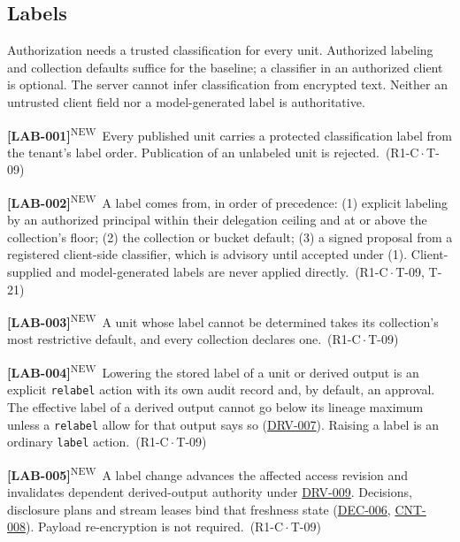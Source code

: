 \documentclass[11pt,a4paper]{article}
\newcommand{\code}[1]{{\small\nolinkurl{#1}}}
\newcommand{\rr}[1]{\hyperlink{req:#1}{#1}}
\newcommand{\reqtag}[2]{{\footnotesize\color{accent}(#1\,$\cdot$\,#2)}}
\newcommand{\reqn}[4]{\par\noindent\hypertarget{req:#1}{\textbf{[#1]}}\textsuperscript{\color{accent}\tiny NEW}\ #4\ \reqtag{#2}{#3}\par}
\begin{document}
\subsection{Labels}\label{sec:labels}
Authorization needs a trusted classification for every unit. Authorized labeling and collection defaults suffice for the baseline; a classifier in an authorized client is optional. The server cannot infer classification from encrypted text. Neither an untrusted client field nor a model-generated label is authoritative.
\reqn{LAB-001}{R1-C}{T-09}{Every published unit carries a protected classification label from the tenant's label order. Publication of an unlabeled unit is rejected.}
\reqn{LAB-002}{R1-C}{T-09, T-21}{A label comes from, in order of precedence: (1) explicit labeling by an authorized principal within their delegation ceiling and at or above the collection's floor; (2) the collection or bucket default; (3) a signed proposal from a registered client-side classifier, which is advisory until accepted under (1). Client-supplied and model-generated labels are never applied directly.}
\reqn{LAB-003}{R1-C}{T-09}{A unit whose label cannot be determined takes its collection's most restrictive default, and every collection declares one.}
\reqn{LAB-004}{R1-C}{T-09}{Lowering the stored label of a unit or derived output is an explicit \code{relabel} action with its own audit record and, by default, an approval. The effective label of a derived output cannot go below its lineage maximum unless a \code{relabel} allow for that output says so (\rr{DRV-007}). Raising a label is an ordinary \code{label} action.}
\reqn{LAB-005}{R1-C}{T-09}{A label change advances the affected access revision and invalidates dependent derived-output authority under \rr{DRV-009}. Decisions, disclosure plans and stream leases bind that freshness state (\rr{DEC-006}, \rr{CNT-008}). Payload re-encryption is not required.}
\end{document}
